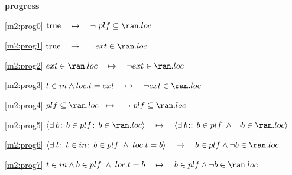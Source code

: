 \textbf{progress}
\begin{block}
\item[ \eqref{m2:prog0} ]{$\true \quad \mapsto\quad \neg ~ plf \subseteq \ran.loc $} %
\item[ \eqref{m2:prog1} ]{$\true \quad \mapsto\quad \neg ext \in \ran. loc $} %
\item[ \eqref{m2:prog2} ]{$ext \in \ran. loc  \quad \mapsto\quad \neg ext \in \ran. loc $} %
\item[ \eqref{m2:prog3} ]{$t \in in \land loc.t = ext  \quad \mapsto\quad \neg ext \in \ran. loc $} %
\item[ \eqref{m2:prog4} ]{$plf \subseteq \ran.loc \!\! \quad \mapsto\quad \neg ~ plf \subseteq \ran.loc $} %
\item[ \eqref{m2:prog5} ]{$\qexists{b}{b \in plf}{ b \in \ran.loc } \quad \mapsto\quad \qexists{b}{}{ b \in plf \1\land \neg b \in \ran.loc } $} %
\item[ \eqref{m2:prog6} ]{$\qexists{t}{t \in in}{ b \in plf \1\land  loc.t = b }  \quad \mapsto\quad b \in plf \land \neg b \in \ran.loc $} %
\item[ \eqref{m2:prog7} ]{$t \in in \land b \in plf \1\land  loc.t = b  \quad \mapsto\quad b \in plf \land \neg b \in \ran.loc $} %
\end{block}
